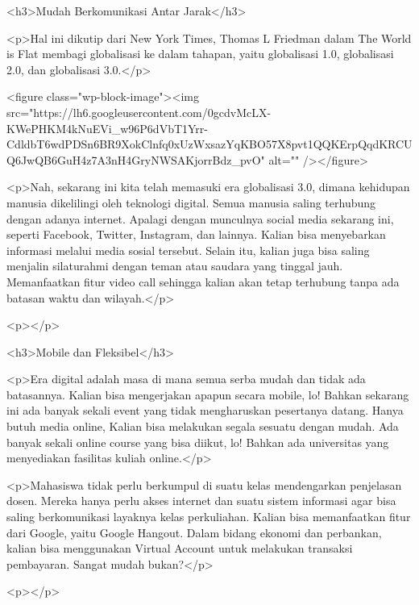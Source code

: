 <h3>Mudah Berkomunikasi Antar Jarak</h3>



<p>Hal ini dikutip dari New York Times, Thomas L Friedman dalam The World is Flat membagi globalisasi ke dalam tahapan, yaitu globalisasi 1.0, globalisasi 2.0, dan globalisasi 3.0.</p>



<figure class="wp-block-image"><img src="https://lh6.googleusercontent.com/0gcdvMcLX-KWePHKM4kNuEVi_w96P6dVbT1Yrr-CdldbT6wdPDSn6BR9XokClnfq0xUzWxsazYqKBO57X8pvt1QQKErpQqdKRCUQ6JwQB6GuH4z7A3nH4GryNWSAKjorrBdz_pvO" alt="" /></figure>



<p>Nah, sekarang ini kita telah memasuki era globalisasi 3.0, dimana kehidupan manusia dikelilingi oleh teknologi digital. Semua manusia saling terhubung dengan adanya internet. Apalagi dengan munculnya social media sekarang ini, seperti Facebook, Twitter, Instagram, dan lainnya. Kalian bisa menyebarkan informasi melalui media sosial tersebut. Selain itu, kalian juga bisa saling menjalin silaturahmi dengan teman atau saudara yang tinggal jauh. Memanfaatkan fitur video call sehingga kalian akan tetap terhubung tanpa ada batasan waktu dan wilayah.</p>



<p></p>



<h3>Mobile dan Fleksibel</h3>



<p>Era digital adalah masa di mana semua serba mudah dan tidak ada batasannya. Kalian bisa mengerjakan apapun secara mobile, lo! Bahkan sekarang ini ada banyak sekali event yang tidak mengharuskan pesertanya datang. Hanya butuh media online, Kalian bisa melakukan segala sesuatu dengan mudah. Ada banyak sekali online course yang bisa diikut, lo! Bahkan ada universitas yang menyediakan fasilitas kuliah online.</p>



<p>Mahasiswa tidak perlu berkumpul di suatu kelas mendengarkan penjelasan dosen. Mereka hanya perlu akses internet dan suatu sistem informasi agar bisa saling berkomunikasi layaknya kelas perkuliahan. Kalian bisa memanfaatkan fitur dari Google, yaitu Google Hangout. Dalam bidang ekonomi dan perbankan, kalian bisa menggunakan Virtual Account untuk melakukan transaksi pembayaran. Sangat mudah bukan?</p>



<p></p>



